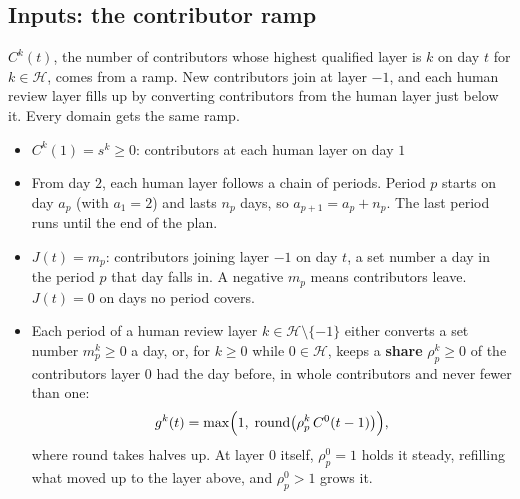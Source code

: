 \documentclass{article}
\begin{document}
\subsection*{Inputs: the contributor ramp}
$C^k(t)$, the number of contributors whose highest qualified layer is $k$ on day $t$ for $k \in \mathcal{H}$, comes from a ramp. New contributors join at layer $-1$, and each human review layer fills up by converting contributors from the human layer just below it. Every domain gets the same ramp.
\begin{itemize}
  \item $C^k(1) = s^k \ge 0$: contributors at each human layer on day $1$

  \item From day $2$, each human layer follows a chain of periods. Period $p$ starts on day $a_p$ (with $a_1 = 2$) and lasts $n_p$ days, so $a_{p+1} = a_p + n_p$. The last period runs until the end of the plan.

  \item $J(t) = m_p$: contributors joining layer $-1$ on day $t$, a set number a day in the period $p$ that day falls in. A negative $m_p$ means contributors leave. $J(t) = 0$ on days no period covers.

  \item Each period of a human review layer $k \in \mathcal{H} \setminus \{-1\}$ either converts a set number $m^k_p \ge 0$ a day, or, for $k \ge 0$ while $0 \in \mathcal{H}$, keeps a \textbf{share} $\rho^k_p \ge 0$ of the contributors layer $0$ had the day before, in whole contributors and never fewer than one:
  \[
    g^k(t) = \max\Bigl(1,\; \operatorname{round}\bigl(\rho^k_p \, C^0(t-1)\bigr)\Bigr),
  \]
  where round takes halves up. At layer $0$ itself, $\rho^0_p = 1$ holds it steady, refilling what moved up to the layer above, and $\rho^0_p > 1$ grows it.
\end{itemize}
\end{document}
